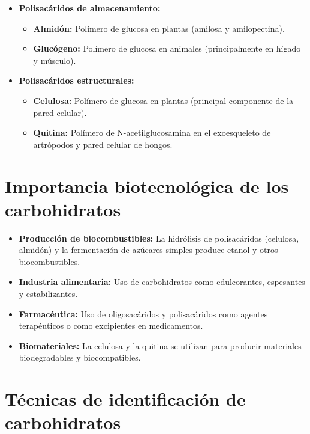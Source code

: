 \begin{itemize}
    \item \textbf{Polisacáridos de almacenamiento:}
    \begin{itemize}
        \item \textbf{Almidón:} Polímero de glucosa en plantas (amilosa y amilopectina).
        \item \textbf{Glucógeno:} Polímero de glucosa en animales (principalmente en hígado y músculo).
    \end{itemize}
    \item \textbf{Polisacáridos estructurales:}
    \begin{itemize}
        \item \textbf{Celulosa:} Polímero de glucosa en plantas (principal componente de la pared celular).
        \item \textbf{Quitina:} Polímero de N-acetilglucosamina en el exoesqueleto de artrópodos y pared celular de hongos.
    \end{itemize}
\end{itemize}

\section{Importancia biotecnológica de los carbohidratos}

\begin{itemize}
    \item \textbf{Producción de biocombustibles:} La hidrólisis de polisacáridos (celulosa, almidón) y la fermentación de azúcares simples produce etanol y otros biocombustibles.
    \item \textbf{Industria alimentaria:} Uso de carbohidratos como edulcorantes, espesantes y estabilizantes.
    \item \textbf{Farmacéutica:} Uso de oligosacáridos y polisacáridos como agentes terapéuticos o como excipientes en medicamentos.
    \item \textbf{Biomateriales:} La celulosa y la quitina se utilizan para producir materiales biodegradables y biocompatibles.
\end{itemize}

\section{Técnicas de identificación de carbohidratos}

